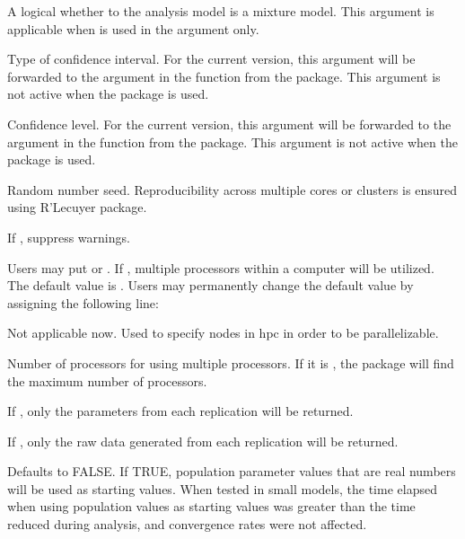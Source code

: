 \documentclass[a4paper]{book}
\begin{document}
\begin{Arguments}
\begin{ldescription}
\item[\code{mxMixture}] 
A logical whether to the analysis model is a mixture model. This argument is applicable when  is used in the  argument only.

\item[\code{citype}] 
Type of confidence interval. For the current version, this argument will be forwarded to the  argument in the   function from the  package. This argument is not active when the  package is used.

\item[\code{cilevel}] 
Confidence level. For the current version, this argument will be forwarded to the  argument in the   function from the  package. This argument is not active when the  package is used.

\item[\code{seed}]  
Random number seed. Reproducibility across multiple cores or clusters is ensured using R'Lecuyer package.

\item[\code{silent}]  
If , suppress warnings.

\item[\code{multicore}]  
Users may put  or . If , multiple processors within a computer will be utilized. The default value is . Users may permanently change the default value by assigning the following line: 

\item[\code{cluster}]  
Not applicable now. Used to specify nodes in hpc in order to be parallelizable.

\item[\code{numProc}]  
Number of processors for using multiple processors. If it is , the package will find the maximum number of processors.

\item[\code{paramOnly}]  
If , only the parameters from each replication will be returned.

\item[\code{dataOnly}]  
If , only the raw data generated from each replication will be returned.

\item[\code{smartStart}] 
Defaults to FALSE. If TRUE, population parameter values that are real numbers will be used as starting values. When tested in small models, the time elapsed when using population values as starting values was greater than the time reduced during analysis, and convergence rates were not affected. 


\end{ldescription}
\end{Arguments}
\end{document}
